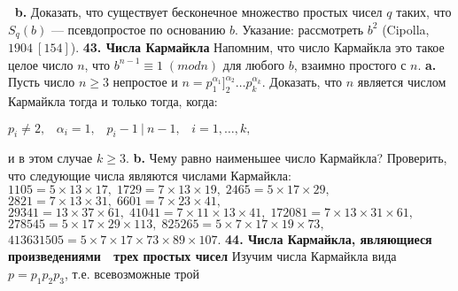 \documentclass{../../template/mai_book}
\begin{document}
$\:$\newline\indent
\textbf{b.} Доказать, что существует бесконечное множество простых чисел $q$ таких, что $S_q(b)$ — псевдопростое по основанию $b$. Указание: рассмо­треть $b^2$ (Cipolla, $1904\:[154]$).
\newpage
\textbf{43. Числа Кармайкла}
\newline \newline \indent
Напомним, что число Кармайкла это такое целое число $n$, что $b^{n - 1} \equiv 1 \; (mod n)$ для любого $b$, взаимно простого с $n$.
\newline \indent
\textbf{a.} Пусть число $n \ge 3$ непростое и $n = p_1^{\alpha_1}]_2^{\alpha_2}\dots p_k^{\alpha_k}$. Доказать, что $n$ является числом Кармайкла тогда и только тогда, когда:
\begin{center}
$p_i \ne 2, \;\;\; \alpha_i = 1, \;\;\; p_i - 1 \:| \: n - 1, \;\;\; i = 1, \dots , k,$
\end{center}
и в этом случае $k \ge 3$.
\newline \indent
\textbf{b.} Чему равно наименьшее число Кармайкла? Проверить, что следующие числа являются числами Кармайкла: 
\newline \newline \indent
\hspace{40pt} $1105 = 5 \times 13 \times 17, \; 1729 = 7 \times 13 \times 19, \; 2465 = 5 \times 17 \times 29,$ \newline \indent
\hspace{85pt}$2821 = 7 \times 13 \times 31, \; 6601 = 7 \times 23 \times 41,$
\newline \indent
\hspace{16pt}$29341 = 13 \times 37 \times 61, \; 41041 = 7 \times 11 \times 13 \times 41, \; 172081 = 7 \times 13 \times 31 \times 61, $
\newline \indent
\hspace{55pt}$278545 = 5 \times 17 \times 29 \times 113, \; 825265 = 5 \times 7 \times 17 \times 19 \times 73, $
\newline \indent
\hspace{85pt}$413631505 = 5 \times 7 \times 17 \times 73 \times 89 \times 107.$
\newline \newline \indent
\textbf{44. Числа Кармайкла, являющиеся произведениями \newline \indent
$\;$ трех простых чисел}
\newline \newline \indent
Изучим числа Кармайкла вида $p = p_1 p_2 p_3$, т.е. всевозможные трой­
\end{document}
